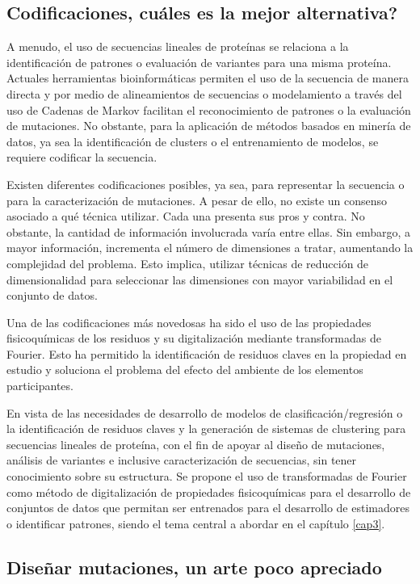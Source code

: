 \subsection{Codificaciones, cuáles es la mejor alternativa?}

A menudo, el uso de secuencias lineales de proteínas se relaciona a la identificación de patrones o evaluación de variantes para una misma proteína. Actuales herramientas bioinformáticas permiten el uso de la secuencia de manera directa y por medio de alineamientos de secuencias o modelamiento a través del uso de Cadenas de Markov facilitan el reconocimiento de patrones o la evaluación de mutaciones. No obstante, para la aplicación de métodos basados en minería de datos, ya sea la identificación de clusters o el entrenamiento de modelos, se requiere codificar la secuencia.

Existen diferentes codificaciones posibles, ya sea, para representar la secuencia o para la caracterización de mutaciones. A pesar de ello, no existe un consenso asociado a qué técnica utilizar. Cada una presenta sus pros y contra. No obstante, la cantidad de información involucrada varía entre ellas. Sin embargo, a mayor información, incrementa el número de dimensiones a tratar, aumentando la complejidad del problema. Esto implica, utilizar técnicas de reducción de dimensionalidad para seleccionar las dimensiones con mayor variabilidad en el conjunto de datos.

Una de las codificaciones más novedosas ha sido el uso de las propiedades fisicoquímicas de los residuos y su digitalización mediante transformadas de Fourier. Esto ha permitido la identificación de residuos claves en la propiedad en estudio y soluciona el problema del efecto del ambiente de los elementos participantes.

En vista de las necesidades de desarrollo de modelos de clasificación/regresión o la identificación de residuos claves y la generación de sistemas de clustering para secuencias lineales de proteína, con el fin de apoyar al diseño de mutaciones, análisis de variantes e inclusive caracterización de secuencias, sin tener conocimiento sobre su estructura. Se propone el uso de transformadas de Fourier como método de digitalización de propiedades fisicoquímicas para el desarrollo de conjuntos de datos que permitan ser entrenados para el desarrollo de estimadores o identificar patrones, siendo el tema central a abordar en el capítulo \ref{cap3}.

\subsection{Diseñar mutaciones, un arte poco apreciado}


